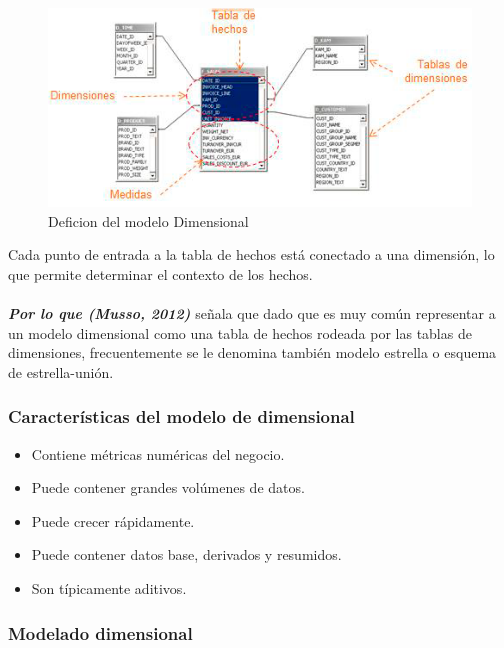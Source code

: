 \documentclass[11pt,a4paper]{article}
\begin{document}
			\begin{figure}[H]
				\begin{center}
					\includegraphics[scale=1.15]{./IMAGENES/img05}	
					\caption{Deficion del modelo Dimensional}		
				\end{center}
			\end{figure}
		Cada punto de entrada a la tabla de hechos está conectado a una dimensión, lo que permite determinar el contexto de los hechos.\\
		\\
		\textit{\textbf{Por lo que (Musso, 2012)}} señala que dado que es muy común representar a un modelo dimensional como una tabla de hechos rodeada por las tablas de dimensiones, frecuentemente se le denomina también modelo estrella o esquema de estrella-unión. 
		
		\subsubsection{Características del modelo de dimensional}
		
		\begin{itemize}
			\item Contiene métricas numéricas del negocio.
			\item Puede contener grandes volúmenes de datos.
			\item Puede crecer rápidamente.
			\item Puede contener datos base, derivados y resumidos.
			\item Son típicamente aditivos.
		\end{itemize}
	
		\subsubsection{Modelado dimensional}
		
\end{document}
